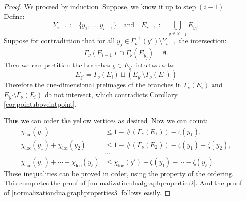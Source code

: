 \documentclass[JEP,XML,SOM,Unicode,NoFloatCountersInSection,published]{cedram}
\theoremstyle{plain}
\theoremstyle{definition}
\newcommand\loc{{\mathrm{loc}}}
\begin{document}
\begin{proof}
We proceed by induction. Suppose, we know it up to step $(i-1)$. Define:\vspace*{-3pt}
\[
Y_{i-1}:=\{y_1,\dots,y_{i-1}\}\quad\text{and}\quad E_{i-1} := \bigcup_{y\in Y_{i-1}} E_{y_i}.
\]
Suppose for contradiction that for all $y_j\in \Gamma_\nu^{-1}(y')\setminus Y_{i-1}$ the intersection:\vspace*{-3pt}
\[
\Gamma_{\nu}(E_{i-1})\cap \Gamma_{\nu}(E_{y_j}) = \emptyset.
\]
Then we can partition the branches $g\in E_{y'}$ into two sets:\vspace*{-3pt}
\[
E_{y'} = \Gamma_\nu(E_i) \sqcup \left(E_{y'}\setminus \Gamma_\nu(E_i)\right)
\]
Therefore the one-dimensional preimages of the branches in $\Gamma_\nu(E_i)$ and $E_{y'}\setminus \Gamma_\nu(E_i)$ do not intersect, which contradicts Corollary \ref{cor:pointaboveintpoint}.

Thus we can order the yellow vertices as desired. Now we can count:\vspace*{-3pt}
\begin{align*}
\chi_\loc(y_1)&\le 1-\#(\Gamma_\nu(E_1))-\zeta(y_1),\\
\chi_\loc(y_1)+\chi_\loc(y_2)&\le 1-\#(\Gamma_\nu(E_2))-\zeta(y_1)-\zeta(y_2),\\[-3pt]
&\dots\\[-3pt]
\chi_\loc(y_1)+\cdots+\chi_\loc(y_\ell)&\le \chi_\loc(y')-\zeta(y_1)-\cdots-\zeta(y_\ell).
\end{align*}
\noindent These inequalities can be proved in order, using the property of the ordering. This completes the proof of \eqref{normalizationdualgraphproperties2}. And the proof of \eqref{normalizationdualgraphproperties3} follows easily.
\end{proof}
\end{document}
